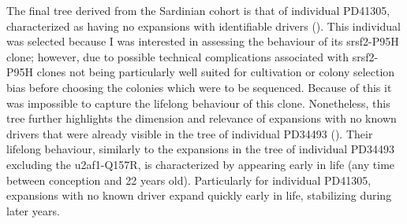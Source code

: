 \begin{figure}[!ht]
	\label{fig:tree-pd34493}
\end{figure}

The final tree derived from the Sardinian cohort is that of individual PD41305, characterized as having no expansions with identifiable drivers (). This individual was selected because I was interested in assessing the behaviour of its \ac{srsf2}-P95H clone; however, due to possible technical complications associated with \ac{srsf2}-P95H clones not being particularly well suited for cultivation or colony selection bias before choosing the colonies which were to be sequenced. Because of this it was impossible to capture the lifelong behaviour of this clone. Nonetheless, this tree further highlights the dimension and relevance of expansions with no known drivers that were already visible in the tree of individual PD34493 (). Their lifelong behaviour, similarly to the expansions in the tree of individual PD34493 excluding the \ac{u2af1}-Q157R, is characterized by appearing early in life (any time between conception and 22 years old). Particularly for individual PD41305, expansions with no known driver expand quickly early in life, stabilizing during later years.

\begin{figure}[!ht]
	\label{fig:tree-pd41305}
\end{figure}

